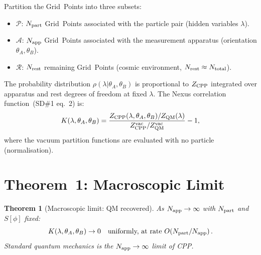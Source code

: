 \documentclass[11pt,a4paper]{article}
\newtheorem{theorem}{Theorem}[section]
\newcommand{\Napp}{N_{\rm app}}
\newcommand{\Npart}{N_{\rm part}}
\newcommand{\Ntot}{N_{\rm total}}
\begin{document}
Partition the Grid~Points into three subsets:
\begin{itemize}
\item $\mathcal{P}$: $\Npart$ Grid~Points associated with the
  particle pair (hidden variables $\lambda$).
\item $\mathcal{A}$: $\Napp$ Grid~Points associated with the
  measurement apparatus (orientation $\theta_A, \theta_B$).
\item $\mathcal{R}$: $N_{\rm rest}$ remaining Grid~Points (cosmic
  environment, $N_{\rm rest} \approx \Ntot$).
\end{itemize}

The probability distribution $\rho(\lambda|\theta_A,\theta_B)$
is proportional to $Z_{\rm CPP}$ integrated over apparatus and
rest degrees of freedom at fixed $\lambda$.  The Nexus correlation
function~(SD\#1 eq.~2) is:
\begin{equation}
K(\lambda,\theta_A,\theta_B)
= \frac{Z_{\rm CPP}(\lambda,\theta_A,\theta_B)
  / Z_{\rm QM}(\lambda)}
       {Z_{\rm CPP}^{\rm vac} / Z_{\rm QM}^{\rm vac}}
  - 1,
\label{eq:K_def}
\end{equation}
where the vacuum partition functions are evaluated with no particle
(normalisation).

\section{Theorem~1: Macroscopic Limit}
\label{sec:macro}

\begin{theorem}[Macroscopic limit: QM recovered]
\label{thm:macro}
As $\Napp \to \infty$ with $\Npart$ and $S[\phi]$ fixed:
\begin{equation}
K(\lambda,\theta_A,\theta_B) \to 0
\quad \text{uniformly, at rate } O\!\left(\Npart/\Napp\right).
\label{eq:K_macro}
\end{equation}
Standard quantum mechanics is the $\Napp \to \infty$ limit of CPP.
\end{theorem}
\end{document}
